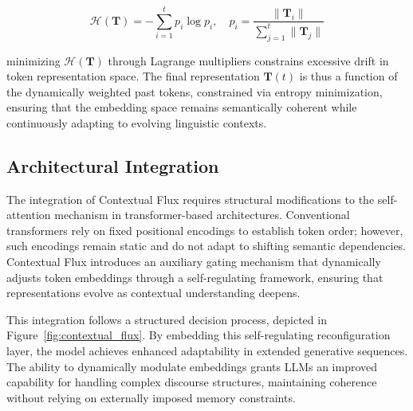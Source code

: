 \documentclass{article}
\begin{document}
\begin{equation}
	\mathcal{H}(\mathbf{T}) = -\sum_{i=1}^{t} p_i \log p_i, \quad p_i = \frac{\|\mathbf{T}_i\|}{\sum_{j=1}^{t} \|\mathbf{T}_j\|}
\end{equation}

minimizing $\mathcal{H}(\mathbf{T})$ through Lagrange multipliers constrains excessive drift in token representation space. The final representation $\mathbf{T}(t)$ is thus a function of the dynamically weighted past tokens, constrained via entropy minimization, ensuring that the embedding space remains semantically coherent while continuously adapting to evolving linguistic contexts.


\subsection{Architectural Integration}

The integration of Contextual Flux requires structural modifications to the self-attention mechanism in transformer-based architectures. Conventional transformers rely on fixed positional encodings to establish token order; however, such encodings remain static and do not adapt to shifting semantic dependencies. Contextual Flux introduces an auxiliary gating mechanism that dynamically adjusts token embeddings through a self-regulating framework, ensuring that representations evolve as contextual understanding deepens.

This integration follows a structured decision process, depicted in Figure~\ref{fig:contextual_flux}. By embedding this self-regulating reconfiguration layer, the model achieves enhanced adaptability in extended generative sequences. The ability to dynamically modulate embeddings grants LLMs an improved capability for handling complex discourse structures, maintaining coherence without relying on externally imposed memory constraints.
\end{document}
